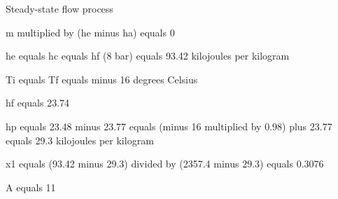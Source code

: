 Steady-state flow process  

m multiplied by (he minus ha) equals 0  

he equals hc equals hf (8 bar) equals 93.42 kilojoules per kilogram  

Ti equals Tf equals minus 16 degrees Celsius  

hf equals 23.74  

hp equals 23.48 minus 23.77 equals (minus 16 multiplied by 0.98) plus 23.77 equals 29.3 kilojoules per kilogram  

x1 equals (93.42 minus 29.3) divided by (2357.4 minus 29.3) equals 0.3076  

A equals 11